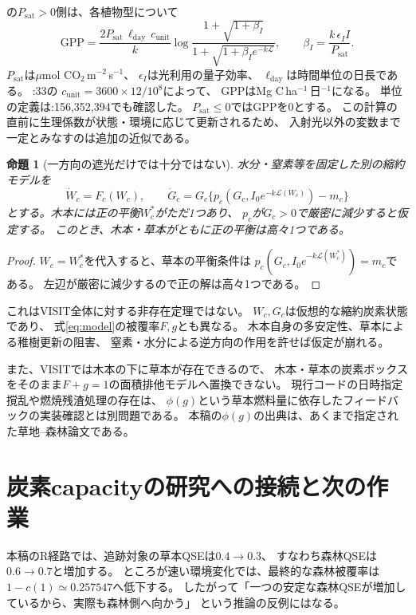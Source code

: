 \documentclass[a4paper,11pt]{ltjsarticle}
\newtheorem{proposition}{命題}
\begin{document}
の$P_{\mathrm{sat}}>0$側は、各植物型について
\begin{equation}
 \mathrm{GPP}=\frac{2P_{\mathrm{sat}}\,\ell_{\mathrm{day}}\,c_{\mathrm{unit}}}k
 \log\frac{1+\sqrt{1+\beta_I}}
               {1+\sqrt{1+\beta_I e^{-k\mathcal L}}},
 \qquad
 \beta_I=\frac{k\,\epsilon_I I}{P_{\mathrm{sat}}}. \label{eq:visitgpp}
\end{equation}
$P_{\mathrm{sat}}$は$\mu$mol CO$_2$\,m$^{-2}$\,s$^{-1}$、
$\epsilon_I$は光利用の量子効率、
$\ell_{\mathrm{day}}$は時間単位の日長である。
:33の
$c_{\mathrm{unit}}=3600\times12/10^8$によって、
GPPはMg C\,ha$^{-1}$\,日$^{-1}$になる。
単位の定義は:156,352,394でも確認した。
$P_{\mathrm{sat}}\le0$ではGPPを0とする。
この計算の直前に生理係数が状態・環境に応じて更新されるため、
入射光以外の変数まで一定とみなすのは追加の近似である。

\begin{proposition}[一方向の遮光だけでは十分ではない]
水分・窒素等を固定した別の縮約モデルを
\[
 \dot W_c=F_c(W_c),\qquad
 \dot G_c=G_c\{p_c(G_c,I_0e^{-k\mathcal L(W_c)})-m_c\}
\]
とする。木本には正の平衡$W_c^*$がただ1つあり、
$p_c$が$G_c>0$で厳密に減少すると仮定する。
このとき、木本・草本がともに正の平衡は高々1つである。
\end{proposition}
\begin{proof}
$W_c=W_c^*$を代入すると、草本の平衡条件は
$p_c(G_c,I_0e^{-k\mathcal L(W_c^*)})=m_c$である。
左辺が厳密に減少するので正の解は高々1つである。
\end{proof}
これはVISIT全体に対する非存在定理ではない。
$W_c,G_c$は仮想的な縮約炭素状態であり、
式\eqref{eq:model}の被覆率$F,g$とも異なる。
木本自身の多安定性、草本による稚樹更新の阻害、
窒素・水分による逆方向の作用を許せば仮定が崩れる。

また、VISITでは木本の下に草本が存在できるので、
木本・草本の炭素ボックスをそのまま$F+g=1$の面積排他モデルへ置換できない。
現行コードの日時指定撹乱や燃焼残渣処理の存在は、
$\phi(g)$という草本燃料量に依存したフィードバックの実装確認とは別問題である。
本稿の$\phi(g)$の出典は、あくまで指定された草地--森林論文である。

\section{炭素capacityの研究への接続と次の作業}
本稿のR経路では、追跡対象の草本QSEは$0.4\to0.3$、
すなわち森林QSEは$0.6\to0.7$と増加する。
ところが速い環境変化では、最終的な森林被覆率は
$1-c(1)\simeq0.257547$へ低下する。
したがって「一つの安定な森林QSEが増加しているから、実際も森林側へ向かう」
という推論の反例にはなる。
\end{document}
